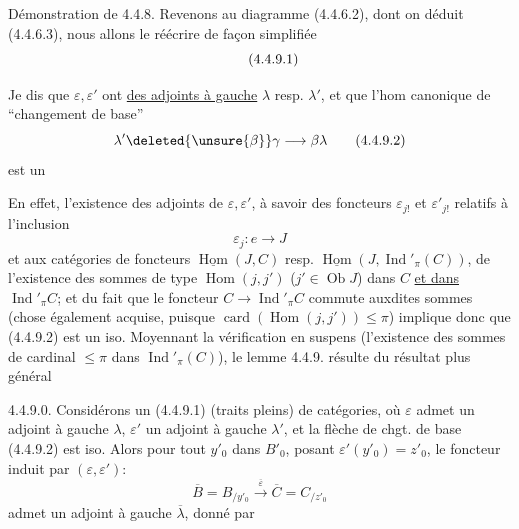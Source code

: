 Démonstration de 4.4.8. Revenons au diagramme (4.4.6.2), dont on déduit (4.4.6.3), nous allons le réécrire de façon simplifiée
\[\tag*{(4.4.9.1)}\vphantom{B}\]

Je dis que $\varepsilon,\varepsilon'$ ont \uline{des adjoints à gauche} $\lambda$  resp. $\lambda'$, et que l'hom canonique de ``changement de base''
\[
\lambda'\deleted{\unsure{\beta}}\gamma\longrightarrow\beta\lambda\tag*{(4.4.9.2)}
\]
est un 

En effet, l'existence des adjoints de $\varepsilon,\varepsilon'$, à savoir des foncteurs $\varepsilon_{j!}$ et $\varepsilon'_{j!}$ relatifs à l'inclusion
\[
\varepsilon_j:e\longrightarrow J
\]
et aux catégories de foncteurs $\underline{\operatorname{Hom}}(J,C)$ resp. $\underline{\operatorname{Hom}}(J,\operatorname{Ind}'_{\pi}(C))$,  de  l'existence des sommes de type $\operatorname{Hom}(j,j')$ ($j'\in\operatorname{Ob}J$) dans $C$  \uline{et dans} $\operatorname{Ind}'_{\pi}C$; et du fait que le foncteur $C\longrightarrow\operatorname{Ind}'_{\pi}C$ commute
auxdites sommes  (chose également  acquise, puisque $\operatorname{card}(\operatorname{Hom}(j,j'))\leq\pi$) implique donc que (4.4.9.2) est un iso.  Moyennant la vérification en suspens (l'existence des sommes de cardinal $\leq\pi$ dans $\operatorname{Ind}'_{\pi}(C)$), le lemme 4.4.9. résulte du résultat plus général

  4.4.9.0. Considérons un   (4.4.9.1) (traits pleins) de catégories, où $\varepsilon$ admet un adjoint à gauche $\lambda$, $\varepsilon'$ un adjoint à gauche $\lambda'$, et la flèche de chgt. de base (4.4.9.2) est iso. Alors pour tout $y'_0$ dans $B'_0$, posant $\varepsilon'(y'_0)=z'_0$, le foncteur induit par $(\varepsilon,\varepsilon')$:
\[
\overline B=B_{/y'_0}\xrightarrow{\overline\varepsilon}\overline C=C_{/z'_0}
\]
admet un adjoint à gauche $\overline\lambda$, donné par


